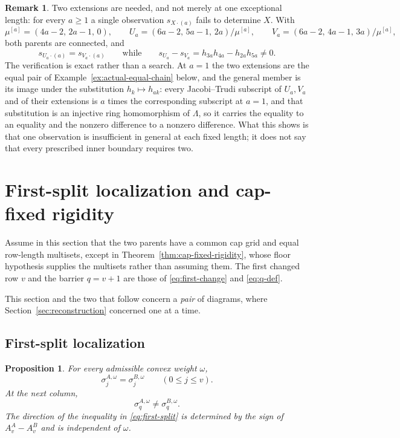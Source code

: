 \documentclass[11pt,a4paper]{amsart}
\numberwithin{equation}{section}
\theoremstyle{plain}
\newtheorem{proposition}[theorem]{Proposition}
\theoremstyle{definition}
\newtheorem{remark}[theorem]{Remark}
\newcommand{\Lam}{\Lambda}
\begin{document}
\begin{remark}\label{rem:one-extension-insufficient}
Two extensions are needed, and not merely at one exceptional length: for every
\(a\ge1\) a single observation \(s_{X\cdot(a)}\) fails to determine \(X\).  With
\[
\mu^{[a]}=(4a-2,\,2a-1,\,0),
\qquad
U_a=(6a-2,\,5a-1,\,2a)/\mu^{[a]},
\qquad
V_a=(6a-2,\,4a-1,\,3a)/\mu^{[a]},
\]
both parents are connected, and
\[
s_{U_a\cdot(a)}=s_{V_a\cdot(a)}
\qquad\text{while}\qquad
s_{U_a}-s_{V_a}=h_{3a}h_{4a}-h_{2a}h_{5a}\ne0 .
\]
The verification is exact rather than a search.  At \(a=1\) the two extensions
are the equal pair of Example~\ref{ex:actual-equal-chain} below, and the general
member is its image under the substitution \(h_k\mapsto h_{ak}\): every
Jacobi--Trudi subscript of \(U_a,V_a\) and of their extensions is \(a\) times
the corresponding subscript at \(a=1\), and that substitution is an injective
ring homomorphism of \(\Lam\), so it carries the equality to an equality and the
nonzero difference to a nonzero difference.  What this shows is that one
observation is insufficient in general at each fixed length; it does not say
that every prescribed inner boundary requires two.
\end{remark}



\section{First-split localization and cap-fixed rigidity}\label{sec:localization}

Assume in this section that the two parents have a common cap grid and equal row-length multisets, except in Theorem~\ref{thm:cap-fixed-rigidity}, whose floor hypothesis supplies the multisets rather than assuming them.  The first changed row \(v\) and the barrier \(q=v+1\) are those of \eqref{eq:first-change} and \eqref{eq:q-def}.

This section and the two that follow concern a \emph{pair} of diagrams, where Section~\ref{sec:reconstruction} concerned one at a time.

\subsection{First-split localization}\label{subsec:first-split}

\begin{proposition}\label{prop:synchronization}
For every admissible convex weight \(\omega\),
\begin{equation}\label{eq:synchronized}
\sigma_j^{A,\omega}=\sigma_j^{B,\omega}
\qquad(0\le j\le v).
\end{equation}
At the next column,
\begin{equation}\label{eq:first-split}
\sigma_q^{A,\omega}\ne\sigma_q^{B,\omega}.
\end{equation}
The direction of the inequality in \eqref{eq:first-split} is determined by the sign of \(A_v^A-A_v^B\) and is independent of \(\omega\).
\end{proposition}
\end{document}
